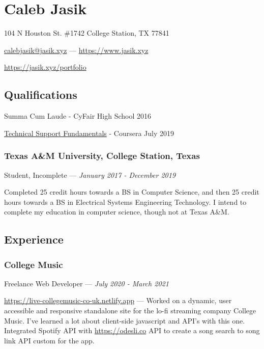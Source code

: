 \documentclass[letterpaper,10pt]{article}
\begin{document}
    \section{\Huge Caleb Jasik}\label{sec:hugecaleb-jasik}

    \hfill 104 N Houston St. \#1742 College Station, TX 77841

    \hfill \href{mailto:calebjasik@jasik.xyz}{calebjasik@jasik.xyz} ---
    \href{https://jasik.xyz}{https://www.jasik.xyz}
    
    \hfill \href{https://jasik.xyz/portfolio}{https://jasik.xyz/portfolio}

    \subsection{Qualifications}\label{subsec:qualifications}

    Summa Cum Laude - CyFair High School 2016

    \href{https://www.coursera.org/account/accomplishments/verify/GZEYJ5VA2YGH}{Technical Support Fundamentals} - Coursera July 2019

    \subsubsection{Texas A\&M University, College Station, Texas}
    \hfill Student, Incomplete --- \emph{January 2017 - December 2019}

    Completed 25 credit hours towards a BS in Computer Science, and then 25 credit hours towards a BS in Electrical Systems Engineering Technology. I intend to complete my education in computer science, though not at Texas A\&M.

    \subsection{Experience}\label{subsec:experience}

    \subsubsection{College Music}
    \hfill Freelance Web Developer --- \emph{July 2020 - March 2021}

    \href{https://live-collegemusic-co-uk.netlify.app}{https://live-collegemusic-co-uk.netlify.app} --- Worked on a dynamic, user accessible and responsive standalone site for the lo-fi streaming company College Music. I've learned a lot about client-side javascript and API's with this one. Integrated Spotify API with \href{https://odesli.co}{https://odesli.co} API to create a song search to song link API custom for the app.
\end{document}
